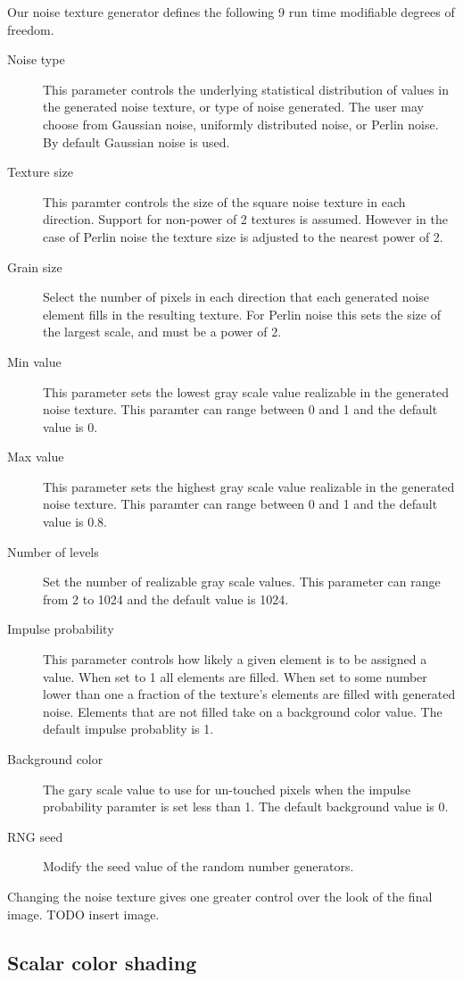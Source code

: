 \documentclass[a4paper,10pt]{article}
\begin{document}
Our noise texture generator defines the following 9 run time modifiable degrees of freedom.
\begin{description}
\item[Noise type] This parameter controls the underlying statistical distribution of values in the generated noise texture, or type of noise generated. The user may choose from Gaussian noise, uniformly distributed noise, or Perlin noise. By default Gaussian noise is used.
\item[Texture size] This paramter controls the size of the square noise texture in each direction. Support for non-power of 2 textures is assumed. However in the case of Perlin noise the texture size is adjusted to the nearest power of 2.
\item[Grain size] Select the number of pixels  in each direction that each generated noise element fills in the resulting texture. For Perlin noise this sets the size of the largest scale, and must be a power of 2.
\item[Min value] This parameter sets the lowest gray scale value realizable in the generated noise texture. This paramter can range between 0 and 1 and the default value is 0.
\item[Max value] This parameter sets the highest gray scale value realizable in the generated noise texture. This paramter can range between 0 and 1 and the default value is 0.8.
\item[Number of levels] Set the number of realizable gray scale values. This parameter can range from 2 to 1024 and the default value is 1024.
\item[Impulse probability] This parameter controls how likely a given element is to be assigned a value. When set to 1 all elements are filled. When set to some number lower than one a fraction of the texture's elements are filled with generated noise. Elements that are not filled take on a background color value. The default impulse probablity is 1.
\item[Background color] The gary scale value to use for un-touched pixels when the impulse probability paramter is set less than 1. The default background value is 0.
\item[RNG seed] Modify the seed value of the random number generators.
\end{description}
Changing the noise texture gives one greater control over the look of the final image. TODO insert image.

\subsection{Scalar color shading}
\end{document}
